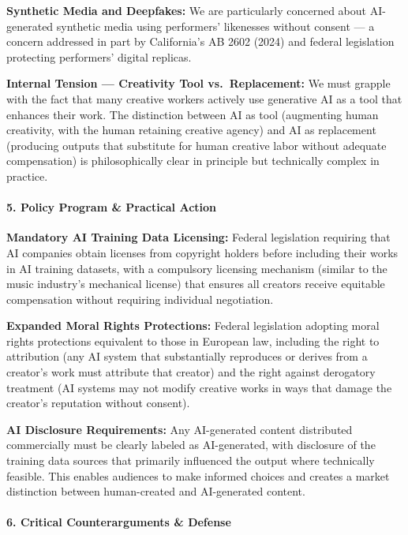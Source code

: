 \textbf{Synthetic Media and Deepfakes:} We are particularly concerned
about AI-generated synthetic media using performers' likenesses without
consent --- a concern addressed in part by California's AB 2602 (2024)
and federal legislation protecting performers' digital replicas.

\textbf{Internal Tension --- Creativity Tool vs.~Replacement:} We must
grapple with the fact that many creative workers actively use generative
AI as a tool that enhances their work. The distinction between AI as
tool (augmenting human creativity, with the human retaining creative
agency) and AI as replacement (producing outputs that substitute for
human creative labor without adequate compensation) is philosophically
clear in principle but technically complex in practice.

\paragraph{5. Policy Program \& Practical
Action}\label{policy-program-practical-action-38}

\textbf{Mandatory AI Training Data Licensing:} Federal legislation
requiring that AI companies obtain licenses from copyright holders
before including their works in AI training datasets, with a compulsory
licensing mechanism (similar to the music industry's mechanical license)
that ensures all creators receive equitable compensation without
requiring individual negotiation.

\textbf{Expanded Moral Rights Protections:} Federal legislation adopting
moral rights protections equivalent to those in European law, including
the right to attribution (any AI system that substantially reproduces or
derives from a creator's work must attribute that creator) and the right
against derogatory treatment (AI systems may not modify creative works
in ways that damage the creator's reputation without consent).

\textbf{AI Disclosure Requirements:} Any AI-generated content
distributed commercially must be clearly labeled as AI-generated, with
disclosure of the training data sources that primarily influenced the
output where technically feasible. This enables audiences to make
informed choices and creates a market distinction between human-created
and AI-generated content.

\paragraph{6. Critical Counterarguments \&
Defense}\label{critical-counterarguments-defense-38}

